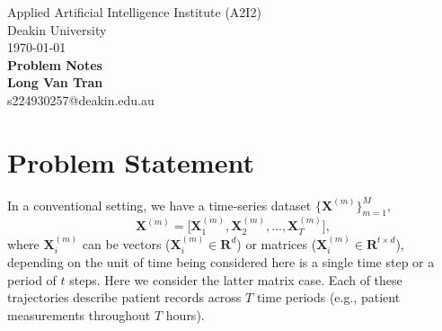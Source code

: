 \documentclass[a4paper, 11pt]{article}
\begin{document}
\begin{sloppypar}
\begin{center}
Applied Artificial Intelligence Institute (A2I2)\\
Deakin University\\
\today\\[24pt]
\LARGE
\textbf{Problem Notes}\\[6pt]
\small
\textbf {Long Van Tran}\\[6pt]
s224930257@deakin.edu.au\\[6pt]
\end{center}





\section{Problem Statement}\label{s:1}
In a conventional setting, we have a time-series dataset $\{\mathbf{X}^{(m)}\}_{m=1}^M$,
\[
\mathbf{X}^{(m)} 
= 
\bigl[\mathbf{X}_{1}^{(m)}, \mathbf{X}_{2}^{(m)}, \ldots, \mathbf{X}_{T}^{(m)}\bigr],
\]
where $\mathbf{X}_{i}^{(m)}$ can be vectors ($\mathbf{X}_{i}^{(m)} \in \mathbf{R}^d$) or matrices
($\mathbf{X}_{i}^{(m)} \in \mathbf{R}^{t \times d}$), depending on the unit of time being considered
here is a single time step or a period of $t$ steps. Here we consider the latter matrix case.
Each of these trajectories describe patient records across \(T\) time periods
(e.g., patient measurements throughout \(T\) hours).


\end{sloppypar}
\end{document}

